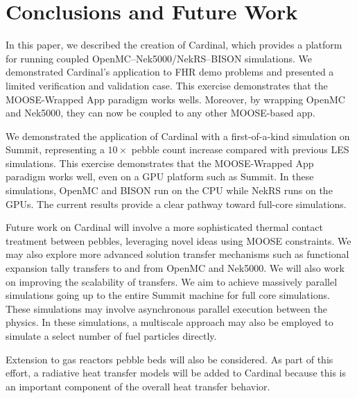 \section{Conclusions and Future Work}
\label{s:sum}


In this paper, we described the creation of Cardinal, which provides a platform for running coupled
OpenMC--Nek5000/NekRS--BISON simulations. We demonstrated Cardinal's application to FHR demo problems and
presented a limited verification and validation case. This exercise demonstrates that the MOOSE-Wrapped App
paradigm works wells. Moreover, by wrapping OpenMC and Nek5000, they can now be coupled to any other MOOSE-based app.

We demonstrated the application of Cardinal with a first-of-a-kind simulation on Summit, representing a $10\times$ pebble count increase compared with previous LES simulations. This exercise demonstrates that the MOOSE-Wrapped App paradigm works well, even on a GPU platform such as Summit. In these simulations, OpenMC and BISON run on the CPU while NekRS runs on the GPUs. The current results provide a clear pathway toward full-core simulations.

Future work on Cardinal will involve a more sophisticated thermal contact treatment between pebbles,
leveraging novel ideas using MOOSE constraints. We may also explore more advanced solution transfer
mechanisms such as functional expansion tally transfers to and from OpenMC and Nek5000. We
will also work on improving the scalability of transfers. We aim to achieve massively parallel simulations going up to the entire Summit machine for full core simulations. These simulations may involve asynchronous parallel execution between the
physics. In these simulations, a multiscale approach may also be employed to simulate a select number of fuel particles directly.

Extension to gas reactors pebble beds will also be considered. As part of this effort, a radiative heat transfer models will be added to Cardinal because this is an important component of the overall heat transfer behavior.
